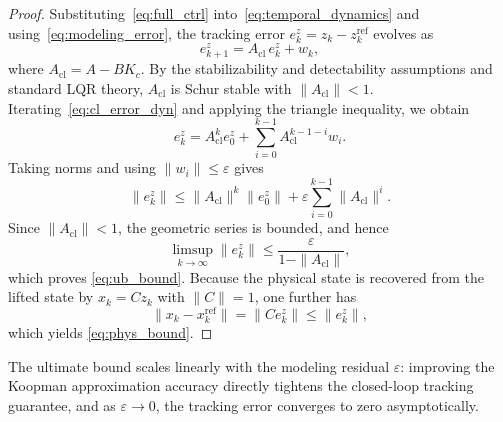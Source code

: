\begin{proof}
Substituting~\eqref{eq:full_ctrl} into~\eqref{eq:temporal_dynamics} and using~\eqref{eq:modeling_error}, the tracking error $e_k^z = z_k - z_k^{\mathrm{ref}}$ evolves as
\begin{equation}
    e_{k+1}^z = A_{\mathrm{cl}}\, e_k^z + w_k,
    \label{eq:cl_error_dyn}
\end{equation}
where $A_{\mathrm{cl}} = A - BK_c$. By the stabilizability and detectability assumptions and standard LQR theory, $A_{\mathrm{cl}}$ is Schur stable with $\|A_{\mathrm{cl}}\| < 1$. Iterating~\eqref{eq:cl_error_dyn} and applying the triangle inequality, we obtain
\begin{equation}
    e_k^z
    =
    A_{\mathrm{cl}}^k e_0^z
    +
    \sum_{i=0}^{k-1}
    A_{\mathrm{cl}}^{k-1-i} w_i.
\end{equation}
Taking norms and using $\|w_i\| \leq \varepsilon$ gives
\begin{equation}
    \|e_k^z\|
    \leq
    \|A_{\mathrm{cl}}\|^k \|e_0^z\|
    +
    \varepsilon \sum_{i=0}^{k-1} \|A_{\mathrm{cl}}\|^i.
\end{equation}
Since $\|A_{\mathrm{cl}}\| < 1$, the geometric series is bounded, and hence
\begin{equation}
    \limsup_{k\to\infty}\|e_k^z\|
    \leq
    \frac{\varepsilon}{1-\|A_{\mathrm{cl}}\|},
\end{equation}
which proves \eqref{eq:ub_bound}. Because the physical state is recovered from the lifted state by $x_k = Cz_k$ with $\|C\| = 1$, one further has
\begin{equation}
    \|x_k - x_k^{\mathrm{ref}}\|
    =
    \|C e_k^z\|
    \leq
    \|e_k^z\|,
\end{equation}
which yields \eqref{eq:phys_bound}.
\end{proof}

The ultimate bound scales linearly with the modeling residual $\varepsilon$: improving the Koopman approximation accuracy directly tightens the closed-loop tracking guarantee, and as $\varepsilon \to 0$, the tracking error converges to zero asymptotically.

